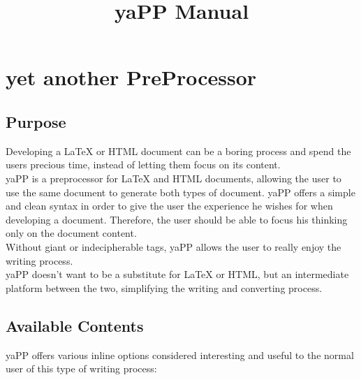 \documentclass{article}
\begin{document}
\title{yaPP Manual}
\maketitle
\section{yet another PreProcessor}
\subsection{Purpose}
Developing a LaTeX or HTML document can be a boring process and spend the users precious time, instead of letting them focus on its content.\\
 yaPP is a preprocessor for LaTeX and HTML documents, allowing the user to use the same document to generate both types of document. yaPP offers a simple and clean syntax in order to give the user the experience he wishes for when developing a document. Therefore, the user should be able to focus his thinking only on the document content.\\
 Without giant or indecipherable tags, yaPP allows the user to really enjoy the writing process.\\
 yaPP doesn't want to be a substitute for LaTeX or HTML, but an intermediate platform between the two, simplifying the writing and converting process. \subsection{Available Contents}
yaPP offers various inline options considered interesting and useful to the normal user of this type of writing process: 
\end{document}
